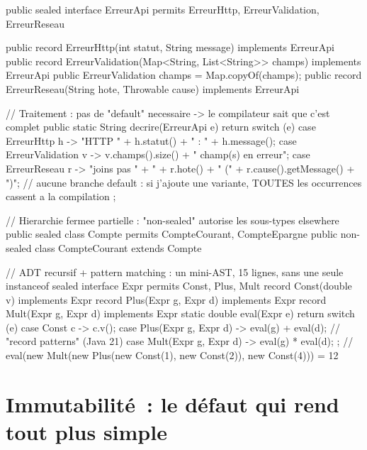 \begin{codejava}
public sealed interface ErreurApi permits ErreurHttp, ErreurValidation, ErreurReseau { }

public record ErreurHttp(int statut, String message) implements ErreurApi { }
public record ErreurValidation(Map<String, List<String>> champs) implements ErreurApi {
    public ErreurValidation { champs = Map.copyOf(champs); }
}
public record ErreurReseau(String hote, Throwable cause) implements ErreurApi { }

// Traitement : pas de "default" necessaire -> le compilateur sait que c'est complet
public static String decrire(ErreurApi e) {
    return switch (e) {
        case ErreurHttp h -> "HTTP " + h.statut() + " : " + h.message();
        case ErreurValidation v -> v.champs().size() + " champ(s) en erreur";
        case ErreurReseau r -> "joins pas " + " + r.hote() + " (" + r.cause().getMessage() + ")";
        // aucune branche default : si j'ajoute une variante, TOUTES les occurrences cassent a la compilation
    };
}

// Hierarchie fermee partielle : "non-sealed" autorise les sous-types elsewhere
public sealed class Compte permits CompteCourant, CompteEpargne { }
public non-sealed class CompteCourant extends Compte { }

// ADT recursif + pattern matching : un mini-AST, 15 lignes, sans une seule instanceof
sealed interface Expr permits Const, Plus, Mult { }
record Const(double v) implements Expr { }
record Plus(Expr g, Expr d) implements Expr { }
record Mult(Expr g, Expr d) implements Expr { }
static double eval(Expr e) {
    return switch (e) {
        case Const c -> c.v();
        case Plus(Expr g, Expr d) -> eval(g) + eval(d);       // "record patterns" (Java 21)
        case Mult(Expr g, Expr d) -> eval(g) * eval(d);
    };
}
// eval(new Mult(new Plus(new Const(1), new Const(2)), new Const(4))) = 12
\end{codejava}

\section{Immutabilit\'e~: le d\'efaut qui rend tout plus simple}


